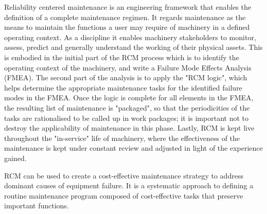 Reliability centered maintenance is an engineering framework that enables the definition of a complete maintenance regimen. It regards maintenance as the means to maintain the functions a user may require of machinery in a defined operating context. As a discipline it enables machinery stakeholders to monitor, assess, predict and generally understand the working of their physical assets. This is embodied in the initial part of the RCM process which is to identify the operating context of the machinery, and write a Failure Mode Effects Analysis (FMEA). The second part of the analysis is to apply the "RCM logic", which helps determine the appropriate maintenance tasks for the identified failure modes in the FMEA. Once the logic is complete for all elements in the FMEA, the resulting list of maintenance is "packaged", so that the periodicities of the tasks are rationalised to be called up in work packages; it is important not to destroy the applicability of maintenance in this phase. Lastly, RCM is kept live throughout the "in-service" life of machinery, where the effectiveness of the maintenance is kept under constant review and adjusted in light of the experience gained.

RCM can be used to create a cost-effective maintenance strategy to address dominant causes of equipment failure. It is a systematic approach to defining a routine maintenance program composed of cost-effective tasks that preserve important functions.




